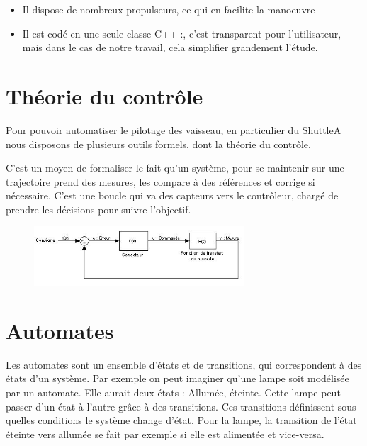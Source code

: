 \documentclass[a4paper,11pt]{report}
\begin{document}
\begin{itemize}
	\item Il dispose de nombreux propulseurs, ce qui en facilite la manoeuvre
	\item Il est codé en une seule classe C++ :, c'est transparent pour l'utilisateur, mais dans le cas de notre travail, cela simplifier grandement l'étude.
\end{itemize}


\section{Théorie du contrôle}
Pour pouvoir automatiser le pilotage des vaisseau, en particulier du ShuttleA nous disposons de plusieurs outils formels, dont la théorie du contrôle.

C'est un moyen de formaliser le fait qu'un système, pour se maintenir sur une trajectoire prend des mesures, les compare à des références et corrige si nécessaire. C'est une boucle qui va des capteurs vers le contrôleur, chargé de prendre les décisions pour suivre l'objectif.

\begin{figure}[!h]
            \begin{center}
                \includegraphics[width=0.7\textwidth]{img/boucle_controle.jpg}
            \end{center}
\end{figure}

\section{Automates}
Les automates sont un ensemble d'états et de transitions, qui correspondent à des états d'un système. Par exemple on peut imaginer qu'une lampe soit modélisée par un automate. Elle aurait deux états : Allumée, éteinte. Cette lampe peut passer d'un état à l'autre grâce à des transitions.
Ces transitions définissent sous quelles conditions le système change d'état.
Pour la lampe, la transition de l'état éteinte vers allumée se fait par exemple si elle est alimentée et vice-versa.
\end{document}

